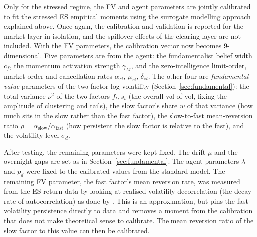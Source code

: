 Only for the stressed regime, the FV and agent parameters are jointly calibrated to fit the stressed ES empirical moments using the surrogate modelling approach explained above. Once again, the calibration and validation is reported for the market layer in isolation, and the spillover effects of the clearing layer are not included. With the FV parameters, the calibration vector now becomes 9-dimensional. Five parameters are from the agent: the fundamentalist belief width $c_f$, the momentum
activation strength $\gamma_M$, and the zero-intelligence limit-order, market-order and cancellation
rates $\alpha_{zi}$, $\mu_{zi}$, $\delta_{zi}$. The other four are \emph{fundamental-value} parameters
of the two-factor log-volatility (Section~\ref{sec:fundamental}): the total variance $\nu^2$ of the two
factors $f_t,s_t$ (the overall vol-of-vol, fixing the amplitude of clustering and tails), the slow
factor's share $w$ of that variance (how much sits in the slow rather than the fast factor), the
slow-to-fast mean-reversion ratio $\rho=\alpha_{\mathrm{slow}}/\alpha_{\mathrm{fast}}$ (how persistent
the slow factor is relative to the fast), and the volatility level $\sigma_d$. 

After testing, the remaining parameters were kept fixed. The drift $\mu$ and the overnight gaps are set
as in Section~\ref{sec:fundamental}. The agent parameters $\lambda$ and $p_d$ were fixed to the calibrated values from the standard model. The remaining FV parameter, the fast factor's mean reversion rate, was measured from the ES return data by looking at realised volatility decorrelation (the decay rate of autocorrelation) as done by \cite{bns_2004}. This is an approximation, but pins the fast volatility persistence directly to data and removes a moment from the calibration that does not make theoretical sense to calibrate. The mean reversion ratio of the slow factor to this value can then be calibrated.

